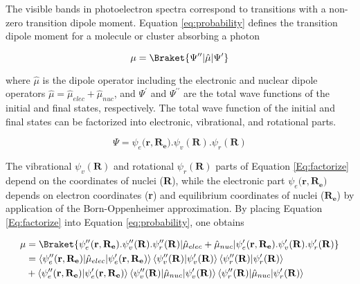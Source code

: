 \begin{refsection}
The visible bands in photoelectron spectra correspond to transitions with a  non-zero transition dipole moment. Equation \ref{eq:probability} defines the transition dipole moment for a molecule or cluster absorbing a photon  

\begin{equation}
\mu=\Braket{\Psi^{\prime\prime}|\hat{\mu}|\Psi^{\prime}} 
\label{eq:probability}
\end{equation}

\noindent where $\hat{\mu}$ is the dipole operator including the electronic and nuclear dipole operators $\hat{\mu} = \hat{\mu}_{elec} + \hat{\mu}_{nuc}$, and $\Psi^{\prime}$ and $\Psi^{\prime\prime}$ are the total wave functions of the initial and final states, respectively. The total wave function of the initial and final states can be factorized into electronic, vibrational, and rotational parts. 

\begin{equation}
\Psi = \psi_{e}(\mathbf{r},\mathbf{R_e)}.\psi_{v}(\mathbf{R}).\psi_{r}(\mathbf{R})
\label{Eq:factorize}
\end{equation}

\noindent The vibrational $\psi_{v}(\mathbf{R})$ and rotational $\psi_{r}(\mathbf{R})$ parts of Equation \ref{Eq:factorize} depend on the coordinates of nuclei (\textbf{R}), while the electronic part $\psi_{e}(\mathbf{r},\mathbf{R_e)}$ depends on electron coordinates (\textbf{r}) and equilibrium coordinates of nuclei ($\mathbf{R_e}$) by application of the Born-Oppenheimer approximation.\cite{c1:Oppenheimer1927} By placing Equation \ref{Eq:factorize} into Equation \ref{eq:probability}, one obtains 

\begin{equation}
\begin{split}
\mu&=\Braket{\psi^{\prime\prime}_{e}(\mathbf{r},\mathbf{R_e)}.\psi^{\prime\prime}_{v}(\mathbf{R}).\psi^{\prime\prime}_{r}(\mathbf{R}) | {\hat{\mu}}_{elec} + {\hat{\mu}}_{nuc} | \psi^{\prime}_{e}(\mathbf{r},\mathbf{R_e)}.\psi^{\prime}_{v}(\mathbf{R}).\psi^{\prime}_{r}(\mathbf{R})}
\\&=\left\langle\psi^{\prime\prime}_{e}(\mathbf{r},\mathbf{R_e})|\hat{\mu}_{elec}|\psi^{\prime}_{e}(\mathbf{r},\mathbf{R_e})\right\rangle\left\langle{\psi^{\prime\prime}_{v}(\mathbf{R})|\psi^{\prime}_{v}(\mathbf{R})}\right\rangle\left\langle\psi^{\prime\prime}_{r}(\mathbf{R})|\psi^{\prime}_{r}(\mathbf{R})\right\rangle \\ 
&+ \left\langle\psi^{\prime\prime}_{e}(\mathbf{r},\mathbf{R_e})|\psi^{\prime}_{e}(\mathbf{r},\mathbf{R_e})\right\rangle\left\langle{\psi^{\prime\prime}_{v}(\mathbf{R})|\hat{\mu}_{nuc}|\psi^{\prime}_{v}(\mathbf{R})}\right\rangle\left\langle\psi^{\prime\prime}_{r}(\mathbf{R})|\hat{\mu}_{nuc}|\psi^{\prime}_{r}(\mathbf{R})\right\rangle
\end{split}
\end{equation}


\end{refsection}

